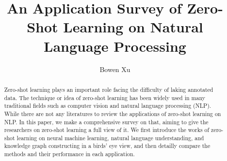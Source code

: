 \documentclass[sigconf, review]{acmart}
\begin{document}
\title{An Application Survey of Zero-Shot Learning on Natural Language Processing}

\author{Bowen Xu}

\begin{abstract}
  Zero-shot learning plays an important role facing the difficulty of laking annotated data. The technique or idea of zero-shot learning has been widely used in many traditional fields such as computer vision and natural language processing (NLP). While there are not any literatures to review the applications of zero-shot learning on NLP. In this paper, we make a comprehensive survey on that, aiming to give the researchers on zero-shot learning a full view of it. We first introduce the works of zero-shot learning on neural machine learning, natural language understanding, and knowledge graph constructing in a birds' eye view, and then detailly compare the methods and their performance in each application. 
\end{abstract}


  
\end{document}
